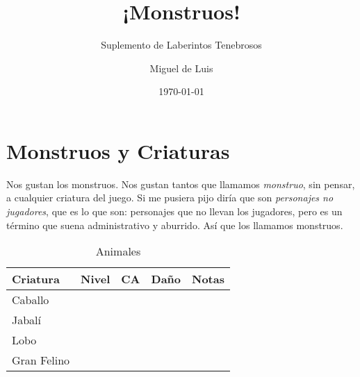 



\title{¡Monstruos!}
\subtitle{Suplemento de Laberintos Tenebrosos}
\author{Miguel de Luis}
\date{\today}
\maketitle

\section{Monstruos y Criaturas}

Nos gustan los monstruos. Nos gustan tantos que llamamos \emph{monstruo}, sin
pensar, a cualquier criatura del juego. Si me pusiera pijo diría que son
\emph{personajes no jugadores}, que es lo que son: personajes que no llevan los
jugadores, pero es un término que suena administrativo y aburrido. Así que los
llamamos monstruos.

\begin{table*}[p]
\caption{Animales}
\label{c:animales}
\centering
\begin{threeparttable}
\begin{tabular}{lcccp{8cm}}
\toprule
Criatura             & Nivel &   CA & Daño & Notas\\
\midrule
Caballo \\
Jabalí \\
Lobo \\
Gran Felino \\
\midrule

\bottomrule
\end{tabular}

\end{threeparttable}
\end{table*}



